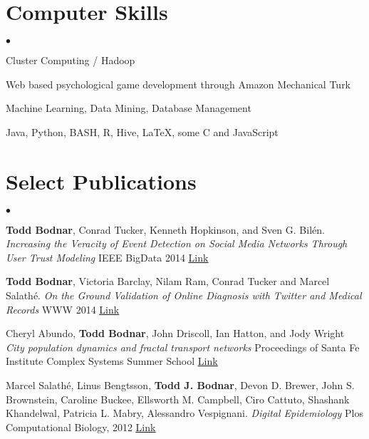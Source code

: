 \documentclass[margin,line]{res}
\newcommand{\linkToUrl}[1]{{\color{blue}\underline{\href{#1}{Link}}}}
\newenvironment{list2}{
  \begin{list}{$\bullet$}{%
      \setlength{\itemsep}{0in}
      \setlength{\parsep}{0in} \setlength{\parskip}{0in}
      \setlength{\topsep}{0in} \setlength{\partopsep}{0in} 
      \setlength{\leftmargin}{10pt}}}{\end{list}}
\begin{document}
\begin{resume}
\section{\sc Computer Skills} 
\begin{list2}
\item Cluster Computing / Hadoop 
\item Web based psychological game development through Amazon Mechanical Turk
\item Machine Learning, Data Mining, Database Management
\item Java, Python, BASH, R, Hive, \LaTeX, some C and JavaScript
\end{list2}

\section{\sc Select Publications}

\begin{list2}


\item \textbf{Todd Bodnar}, Conrad Tucker, Kenneth Hopkinson, and Sven G. Bil\'en. \textit{Increasing the Veracity of Event Detection on Social Media Networks Through User Trust Modeling} IEEE BigData 2014 \linkToUrl{http://bit.ly/18RqYCR}

\item \textbf{Todd Bodnar}, Victoria Barclay, Nilam Ram, Conrad Tucker and Marcel Salath\'e. \textit{On the Ground Validation of Online Diagnosis with Twitter and Medical Records} WWW 2014 \linkToUrl{http://bit.ly/R82tZp}

\item Cheryl Abundo, \textbf{Todd Bodnar}, John Driscoll, Ian Hatton, and Jody Wright
 \textit{City population dynamics and fractal transport networks} Proceedings of Santa Fe Institute Complex Systems Summer School \linkToUrl{bit.ly/19A22vY}

\item Marcel Salath\'e, Linus Bengtsson, \textbf{Todd J. Bodnar}, Devon D. Brewer, John S. Brownstein, Caroline Buckee, Ellsworth M. Campbell, Ciro Cattuto, Shashank Khandelwal, Patricia L. Mabry,  Alessandro Vespignani. \textit{Digital Epidemiology} Plos Computational Biology, 2012 \linkToUrl{http://bitly.com/PO2fSx}

\end{list2}



\end{resume}
\end{document}
